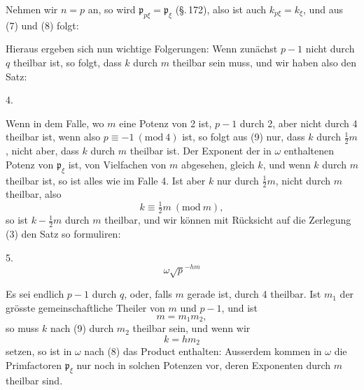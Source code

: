 
Nehmen wir $n = p$ an, so wird $\mathfrak{p}_{p\xi} = \mathfrak{p}_\xi$ (\S.\,172), also ist auch $k_{p\xi} = k_\xi$, und aus (7) und (8) folgt:

Hieraus ergeben sich nun wichtige Folgerungen: Wenn zunächst $p - 1$ nicht durch $q$ theilbar ist, so folgt, dass $k$ durch $m$ theilbar sein muss, und wir haben also den Satz:

4. 

Wenn in dem Falle, wo $m$ eine Potenz von 2 ist, $p - 1$ durch 2, aber nicht durch 4 theilbar ist, wenn also $p \equiv -1 \ (\mathrm{mod}\ 4)$ ist, so folgt aus (9) nur, dass $k$ durch $\tfrac{1}{2} m$, nicht aber, dass $k$ durch $m$ theilbar ist. Der Exponent der in $\omega$ enthaltenen Potenz von $\mathfrak{p}_\xi$ ist, von Vielfachen von $m$ abgesehen, gleich $k$, und wenn $k$ durch $m$ theilbar ist, so ist alles wie im Falle 4. Ist aber $k$ nur durch $\tfrac{1}{2} m$, nicht durch $m$ theilbar, also
\[
k \equiv \tfrac{1}{2} m \ (\mathrm{mod}\ m),
\]
so ist $k - \tfrac{1}{2} m$ durch $m$ theilbar, und wir können mit Rücksicht auf die Zerlegung (3) den Satz so formuliren:

5. 
\[
\omega \sqrt{p}^{-hm}
\]

Es sei endlich $p - 1$ durch $q$, oder, falls $m$ gerade ist, durch 4 theilbar. Ist $m_1$ der grösste gemeinschaftliche Theiler von $m$ und $p - 1$, und ist
\[
m = m_1 m_2,
\]
so muss $k$ nach (9) durch $m_2$ theilbar sein, und wenn wir
\[
k = h m_2
\]
setzen, so ist in $\omega$ nach (8) das Product enthalten:
Ausserdem kommen in $\omega$ die Primfactoren $\mathfrak{p}_\xi$ nur noch in solchen Potenzen vor, deren Exponenten durch $m$ theilbar sind.
